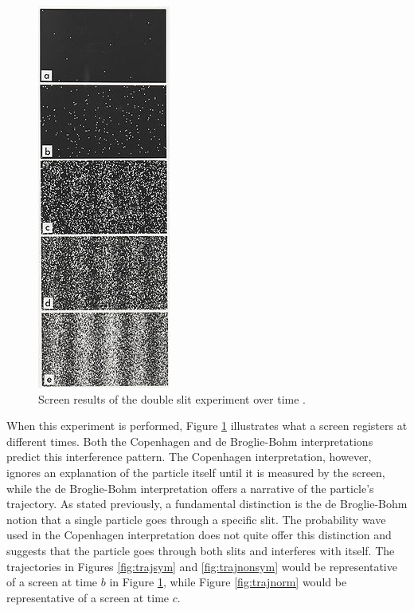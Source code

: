 \documentclass[10pt, reqno]{article}
\begin{document}
  \begin{figure}
    \centerline{\includegraphics[scale=4.5]{./imgs/double-slit-results.jpg}}
    \caption{
    Screen results of the double slit experiment over time \cite{wiki}.
    }
    \label{fig:double-slit-results}
  \end{figure}

  When this experiment is performed, Figure \ref{fig:double-slit-results} illustrates what a screen registers at different times.
  Both the Copenhagen and de Broglie-Bohm interpretations predict this interference pattern.
  The Copenhagen interpretation, however, ignores an explanation of the particle itself until it is measured by the screen, 
    while the de Broglie-Bohm interpretation offers a narrative of the particle's trajectory.
  As stated previously, a fundamental distinction is the de Broglie-Bohm notion that a single particle goes through a specific slit.
  The probability wave used in the Copenhagen interpretation does not quite offer this distinction and
    suggests that the particle goes through both slits and interferes with itself.
  The trajectories in Figures \ref{fig:trajsym} and \ref{fig:trajnonsym} would be representative of a screen at time $b$ in Figure \ref{fig:double-slit-results}, 
    while Figure \ref{fig:trajnorm} would be representative of a screen at time $c$.
\end{document}
